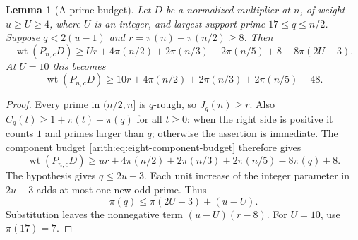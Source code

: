 \documentclass[11pt]{article}
\DeclareMathOperator{\wt}{wt}\DeclareMathOperator{\ord}{ord}
\numberwithin{equation}{section}
\newtheorem{lemma}[theorem]{Lemma}
\theoremstyle{definition}\newtheorem{definition}[theorem]{Definition}
\theoremstyle{remark}\newtheorem{remark}[theorem]{Remark}
\begin{document}
\begin{lemma}[A prime budget]\label{arith:lem:eight-endpoint-prime-budget}
Let $D$ be a normalized multiplier at $n$, of weight
$u\ge U\ge4$, where $U$ is an integer, and largest support prime
$17\le q\le n/2$. Suppose $q<2(u-1)$ and
$r=\pi(n)-\pi(n/2)\ge8$. Then
\[
 \wt(P_{n,c}D)\ge Ur+4\pi(n/2)+2\pi(n/3)+2\pi(n/5)
                         +8-8\pi(2U-3).
\]
At $U=10$ this becomes
\begin{equation}\label{arith:eq:ten-prime-budget}
 \wt(P_{n,c}D)\ge10r+4\pi(n/2)+2\pi(n/3)+2\pi(n/5)-48.
\end{equation}
\end{lemma}
\begin{proof}
Every prime in $(n/2,n]$ is $q$-rough, so $J_q(n)\ge r$.
Also $C_q(t)\ge1+\pi(t)-\pi(q)$ for all $t\ge0$: when the right
side is positive it counts $1$ and primes larger than $q$; otherwise
the assertion is immediate. The component budget
\eqref{arith:eq:eight-component-budget} therefore gives
\[
 \wt(P_{n,c}D)\ge ur+4\pi(n/2)+2\pi(n/3)+2\pi(n/5)-8\pi(q)+8.
\]
The hypothesis gives $q\le2u-3$. Each unit increase of the integer
parameter in $2u-3$ adds at most one new odd prime. Thus
\[
 \pi(q)\le\pi(2U-3)+(u-U).
\]
Substitution leaves the nonnegative term $(u-U)(r-8)$.
For $U=10$, use $\pi(17)=7$.
\end{proof}
\end{document}
